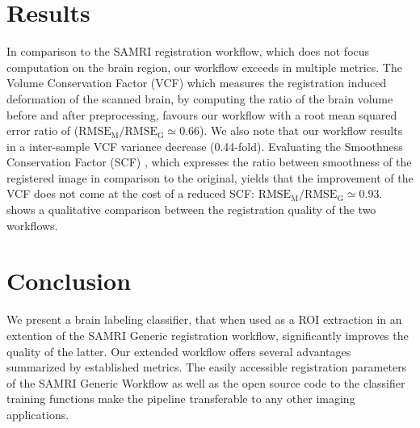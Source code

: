 \documentclass[11pt, english]{article}
\begin{document}
    \section{Results}
    In comparison to the SAMRI registration workflow, which does not focus computation on the brain region, our workflow exceeds in multiple metrics.
    The Volume Conservation Factor (VCF) \citep{ioanas_optimized_2019} which measures the registration induced deformation of the scanned brain, by computing the ratio of the brain volume before and after preprocessing, favours our workflow with a root mean squared error ratio of ($\mathrm{RMSE_{M}/RMSE_{G}\simeq} 0.66$).
    We also note that our workflow results in a inter-sample VCF variance decrease (0.44-fold).
    Evaluating the Smoothness Conservation Factor (SCF) \citep{ioanas_optimized_2019}, which expresses the ratio between smoothness of the registered image in comparison to the original, yields that the improvement of the VCF does not come at the cost of a reduced SCF: $\mathrm{RMSE_{M}/RMSE_{G}\simeq} 0.93$.
     shows a qualitative comparison between the registration quality of the two workflows.


    \begin{sansmath}
    \end{sansmath}


    \section{Conclusion}
    We present a brain labeling classifier, that when used as a ROI extraction in an extention of the SAMRI Generic registration workflow, significantly improves the quality of the latter.
    Our extended workflow offers several advantages summarized by established metrics.
    The easily accessible registration parameters of the SAMRI Generic Workflow as well as the open source code to the classifier training functions make the pipeline transferable to any other imaging applications.




    \clearpage
    \printbibliography
\end{document}
